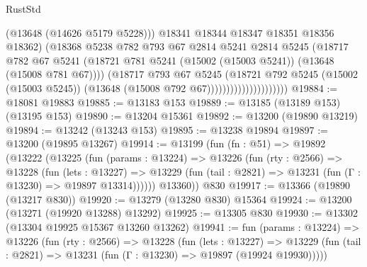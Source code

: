 \begin{lexlean}{RustStd}
\begin{coremodule}
                                        (@13648 (@14626 @5179 @5228)))
                                      @18341
                                      @18344
                                      @18347
                                      @18351
                                      @18356
                                      @18362)
                                    (@18368
                                      @5238
                                      @782
                                      @793
                                      @67
                                      @2814
                                      @5241
                                      @2814
                                      @5245
                                      (@18717
                                        @782
                                        @67
                                        @5241
                                        (@18721
                                          @781
                                          @5241
                                          (@15002 (@15003 @5241))
                                          (@13648 (@15008 @781 @67))))
                                      (@18717
                                        @793
                                        @67
                                        @5245
                                        (@18721
                                          @792
                                          @5245
                                          (@15002 (@15003 @5245))
                                          (@13648 (@15008 @792 @67)))))))))))))))))))))
@19884 := @18081 @19883
@19885 := @13183 @153
@19889 := @13185 (@13189 @153) (@13195 @153)
@19890 := @13204 @15361
@19892 := @13200 (@19890 @13219)
@19894 := @13242 (@13243 @153)
@19895 := @13238 @19894
@19897 := @13200 (@19895 @13267)
@19914 := @13199
    (fun (fn : @51) =>
    @19892
      (@13222
        (@13225
          (fun (params : @13224) =>
          @13226
            (fun (rty : @2566) =>
            @13228
              (fun (lets : @13227) =>
              @13229 (fun (tail : @2821) => @13231 (fun (Γ : @13230) => @19897 @13314))))))
        @13360))
    @830
@19917 := @13366 (@19890 (@13217 @830))
@19920 := @13279 (@13280 @830) @15364
@19924 := @13200 (@13271 (@19920 @13288) @13292)
@19925 := @13305 @830
@19930 := @13302 (@13304 @19925 @15367 @13260 @13262)
@19941 := fun (params : @13224) =>
  @13226
    (fun (rty : @2566) =>
    @13228
      (fun (lets : @13227) =>
      @13229 (fun (tail : @2821) => @13231 (fun (Γ : @13230) => @19897 (@19924 @19930)))))

\end{coremodule}
\end{lexlean}
